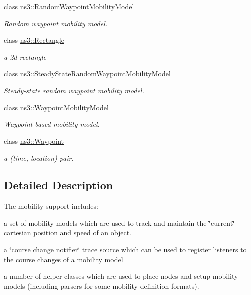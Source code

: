 \begin{DoxyCompactItemize}
class \hyperlink{classns3_1_1RandomWaypointMobilityModel}{ns3\+::\+Random\+Waypoint\+Mobility\+Model}
\begin{DoxyCompactList}\small\item\em Random waypoint mobility model. \end{DoxyCompactList}\item 
class \hyperlink{classns3_1_1Rectangle}{ns3\+::\+Rectangle}
\begin{DoxyCompactList}\small\item\em a 2d rectangle \end{DoxyCompactList}\item 
class \hyperlink{classns3_1_1SteadyStateRandomWaypointMobilityModel}{ns3\+::\+Steady\+State\+Random\+Waypoint\+Mobility\+Model}
\begin{DoxyCompactList}\small\item\em Steady-\/state random waypoint mobility model. \end{DoxyCompactList}\item 
class \hyperlink{classns3_1_1WaypointMobilityModel}{ns3\+::\+Waypoint\+Mobility\+Model}
\begin{DoxyCompactList}\small\item\em Waypoint-\/based mobility model. \end{DoxyCompactList}\item 
class \hyperlink{classns3_1_1Waypoint}{ns3\+::\+Waypoint}
\begin{DoxyCompactList}\small\item\em a (time, location) pair. \end{DoxyCompactList}\end{DoxyCompactItemize}


\subsection{Detailed Description}
The mobility support includes\+:
\begin{DoxyItemize}
\item a set of mobility models which are used to track and maintain the \char`\"{}current\char`\"{} cartesian position and speed of an object.
\item a \char`\"{}course change notifier\char`\"{} trace source which can be used to register listeners to the course changes of a mobility model
\item a number of helper classes which are used to place nodes and setup mobility models (including parsers for some mobility definition formats). 
\end{DoxyItemize}